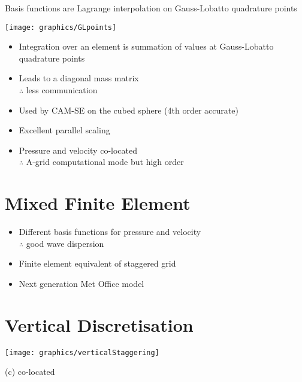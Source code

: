 \begin{minipage}[t]{0.48\columnwidth}%
Basis functions are Lagrange interpolation on Gauss-Lobatto quadrature
points

\texttt{[image: graphics/GLpoints]}%
\end{minipage}\hfill{}%
\begin{minipage}[t]{0.48\columnwidth}%
\begin{itemize}
\item Integration over an element is summation of values at Gauss-Lobatto
quadrature points
\item Leads to a diagonal mass matrix\\
$\therefore$ less communication 
\item Used by CAM-SE on the cubed sphere (4th order accurate)
\item Excellent parallel scaling
\item Pressure and velocity co-located\\
$\therefore$ A-grid computational mode but high order
\end{itemize}
%
\end{minipage}

\section{Mixed Finite Element}
\begin{itemize}
\item Different basis functions for pressure and velocity\\
$\therefore$ good wave dispersion
\item Finite element equivalent of staggered grid
\item Next generation Met Office model
\end{itemize}
\clearpage{}

\section{Vertical Discretisation}

\begin{minipage}[t]{0.66\columnwidth}%
\phantom{}\texttt{[image: graphics/verticalStaggering]}%
\end{minipage} %
\begin{minipage}[t]{0.25\columnwidth}%
\begin{center}
\phantom{}\vspace{-0.3cm}
(c) co-located
\par\end{center}
\resizebox{1\textwidth}{!}{}%
\end{minipage}

